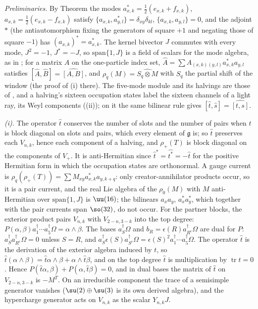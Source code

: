 \emph{Preliminaries.} By Theorem  the modes $a^{*}_{x,k} = \tfrac12(e_{x,k} + f_{x,k})$, $a_{x,k} = \tfrac12(e_{x,k} - f_{x,k})$ satisfy $\{a_{x,k}, a^{*}_{y,l}\} = \delta_{xy}\delta_{kl}$, $\{a_{x,k}, a_{y,l}\} = 0$, and the adjoint $*$ (the antiautomorphism fixing the generators of square $+1$ and negating those of square $-1$) has $(a_{x,k})^{*} = a^{*}_{x,k}$. The kernel bivector $J$ commutes with every mode, $J^{2} = -1$, $J^{*} = -J$, so $\mathrm{span}\{1, J\}$ is a field of scalars for the mode algebra, as in ; for a matrix $A$ on the one-particle index set, $\hat A = \sum A_{(x,k)(y,l)}a^{*}_{x,k}a_{y,l}$ satisfies $[\hat A, \hat B] = \widehat{[A, B]}$, and $\rho_{q}(M) = \widehat{S_{q} \otimes M}$ with $S_{q}$ the partial shift of the window (the proof of (i) there). The five-mode module and its halvings are those of , and a halving's sixteen occupation states label the sixteen channels of a light ray, its Weyl components ((ii)); on it the same bilinear rule gives $[\hat t, \hat s] = \widehat{[t, s]}$.

\emph{(i).} The operator $\hat t$ conserves the number of slots and the number of pairs when $t$ is block diagonal on slots and pairs, which every element of $\mathfrak{g}$ is; so $\hat t$ preserves each $V_{n,k}$, hence each component of a halving, and $\rho_{+}(T)$ is block diagonal on the components of $V_{+}$. It is anti-Hermitian since $\hat t^{*} = \widehat{t^{*}} = -\hat t$ for the positive Hermitian form in which the occupation states are orthonormal. A gauge current is $\rho_{q}(\rho_{+}(T)) = \sum M_{xy}a^{*}_{x,k}a_{y,k+q}$: only creator-annihilator products occur, so it is a pair current, and the real Lie algebra of the $\rho_{0}(M)$ with $M$ anti-Hermitian over $\mathrm{span}\{1, J\}$ is $\uu(16)$; the bilinears $a_{x}a_{y}$, $a^{*}_{x}a^{*}_{y}$, which together with the pair currents span $\so(32)$, do not occur. For the partner blocks, the exterior product pairs $V_{n,k}$ with $V_{2-n,3-k}$ into the top degree: $P(\alpha, \beta)a^{\dagger}_{1}\cdots a^{\dagger}_{5}\Omega = \alpha\wedge\beta$. The bases $a^{\dagger}_{S}\Omega$ and $b_{R} = \epsilon(R)a^{\dagger}_{R^{c}}\Omega$ are dual for $P$: $a^{\dagger}_{S}a^{\dagger}_{R^{c}}\Omega = 0$ unless $S = R$, and $a^{\dagger}_{S}\epsilon(S)a^{\dagger}_{S^{c}}\Omega = \epsilon(S)^{2}a^{\dagger}_{1}\cdots a^{\dagger}_{5}\Omega$. The operator $\hat t$ is the derivation of the exterior algebra induced by $t$, so $\hat t(\alpha\wedge\beta) = \hat t\alpha\wedge\beta + \alpha\wedge\hat t\beta$, and on the top degree $\hat t$ is multiplication by $\operatorname{tr}t = 0$. Hence $P(\hat t\alpha, \beta) + P(\alpha, \hat t\beta) = 0$, and in dual bases the matrix of $\hat t$ on $V_{2-n,3-k}$ is $-M^{T}$. On an irreducible component the trace of a semisimple generator vanishes ($\su(2) \oplus \su(3)$ is its own derived algebra), and the hypercharge generator acts on $V_{n,k}$ as the scalar $Y_{n,k}J$.

